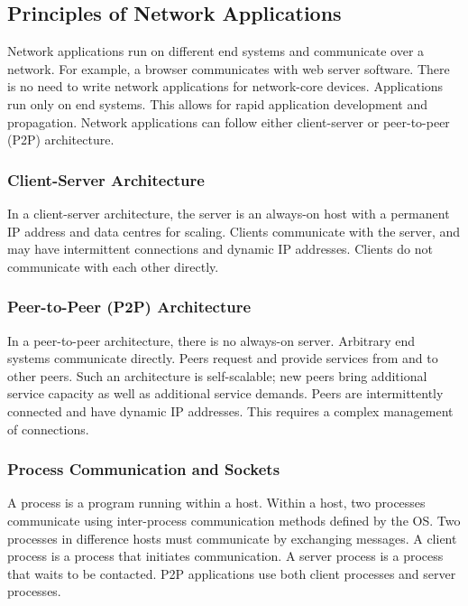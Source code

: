 \subsection{Principles of Network Applications}

Network applications run on different end systems and communicate over a network.
For example, a browser communicates with web server software.
There is no need to write network applications for network-core devices.
Applications run only on end systems.
This allows for rapid application development and propagation.
Network applications can follow either client-server or peer-to-peer (P2P) architecture.

\subsubsection{Client-Server Architecture}

In a client-server architecture, the server is an always-on host with a permanent IP address and data centres for scaling.
Clients communicate with the server, and may have intermittent connections and dynamic IP addresses.
Clients do not communicate with each other directly.

\subsubsection{Peer-to-Peer (P2P) Architecture}

In a peer-to-peer architecture, there is no always-on server.
Arbitrary end systems communicate directly.
Peers request and provide services from and to other peers.
Such an architecture is self-scalable; new peers bring additional service capacity as well as additional service demands.
Peers are intermittently connected and have dynamic IP addresses.
This requires a complex management of connections.

\subsubsection{Process Communication and Sockets}

A process is a program running within a host.
Within a host, two processes communicate using inter-process communication methods defined by the OS\@.
Two processes in difference hosts must communicate by exchanging messages.
A client process is a process that initiates communication.
A server process is a process that waits to be contacted.
P2P applications use both client processes and server processes.

